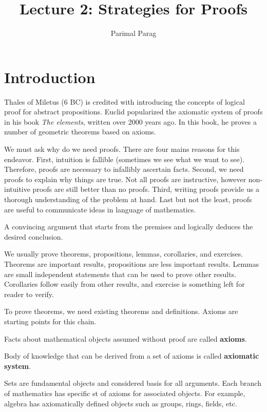 \documentclass[a4paper,english,12pt]{article}
\begin{document}
\title{Lecture 2: Strategies for Proofs}
\author{Parimal Parag}
\maketitle

\section{Introduction}
Thales of Miletus (6 BC) is credited with introducing the concepts of logical proof for abstract propositions. Euclid popularized the axiomatic system of proofs in his book \emph{The elements}, written over 2000 years ago. In this book, he proves a number of geometric theorems based on axioms.

We must ask why do we need proofs. There are four mains reasons for this endeavor. First, intuition is fallible (sometimes we see what we want to see). Therefore, proofs are necessary to infallibly ascertain facts. Second, we need proofs to explain why things are true. Not all proofs are instructive, however non-intuitive proofs are still better than no proofs. Third, writing proofs provide us a thorough understanding of the problem at hand. Last but not the least, proofs are useful to communicate ideas in language of mathematics. 

\begin{defn} A convincing argument that starts from the premises and logically deduces the desired conclusion.
\end{defn}
We usually prove theorems, propositions, lemmas, corollaries, and exercises. Theorems are important results, propositions are less important results. Lemmas are small independent statements that can be used to prove other results. Corollaries follow easily from other results, and exercise is something left for reader to verify. 

To prove theorems, we need existing theorems and definitions. Axioms are starting points for this chain.
\begin{defn}[Axioms] Facts about mathematical objects assumed without proof are called \textbf{axioms}.
\end{defn}
\begin{defn} Body of knowledge that can be derived from a set of axioms is called \textbf{axiomatic system}.
\end{defn}
Sets are fundamental objects and considered basis for all arguments. Each branch of mathematics has specific st of axioms for associated objects. For example, algebra has axiomatically defined objects such as groups, rings, fields, etc.
\end{document}
